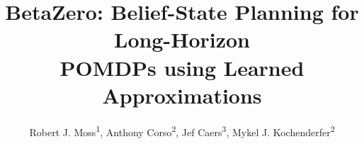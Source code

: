 \setcounter{secnumdepth}{1} %

%


\title{BetaZero: Belief-State Planning for Long-Horizon\\POMDPs using Learned Approximations}
\author{
    Robert J. Moss\textsuperscript{\rm 1}, Anthony Corso\textsuperscript{\rm 2}, Jef Caers\textsuperscript{\rm 3}, Mykel J. Kochenderfer\textsuperscript{\rm 2}
}


\usepackage{bibentry}

\newcommand{\rulesep}{\unskip\ \textcolor{lightgray}{\vrule}\ }
\newcommand{\tworow}[1]{\multirow{2}{*}{{#1}}}
\newcommand{\cpomcpow}{\cite{sunberg2018online,wu2021adaptive}}
\newcommand{\cdespot}{\cite{ye2017despot,wu2021adaptive}}
\newcommand{\cadaops}{\cite{wu2021adaptive}}
\newcommand{\scs}[1]{{\scriptsize#1}}
\newcommand{\pp}{\phantom{)}}
\newcommand{\td}[1]{\color{magenta}#1}
\newcommand{\negphantom}[1]{\settowidth{\dimen0}{#1}\hspace*{-\dimen0}}
\newcommand{\np}{\negphantom{)}}
\newcommand{\lit}[1]{{\color[rgb]{0.7,0.7,0.7}(#1)}\np}
\newcommand{\litdesc}[1]{\lit{#1}\phantom{)}}
\newcommand{\textdoublequotes}{\textsf{''}}
\newcommand{\sameresultsparen}{\textdoublequotes{}\phantom{\ 0.00)}}
\newcommand{\sameresults}{\textdoublequotes{}}


